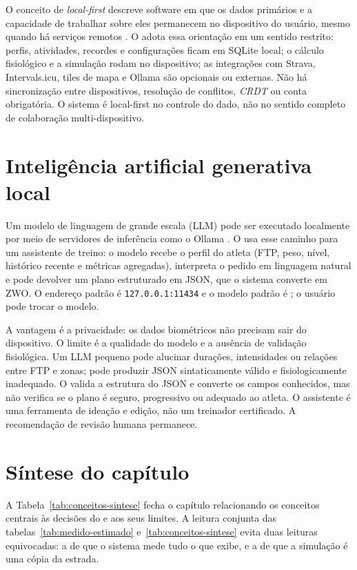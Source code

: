 O conceito de \textit{local-first} descreve software em que os dados primários
e a capacidade de trabalhar sobre eles permanecem no dispositivo do usuário,
mesmo quando há serviços remotos \cite{kleppmann2019}. O \argus{} adota essa
orientação em um sentido restrito: perfis, atividades, recordes e configurações
ficam em SQLite local; o cálculo fisiológico e a simulação rodam no
dispositivo; as integrações com Strava, Intervals.icu, tiles de mapa e Ollama
são opcionais ou externas. Não há sincronização entre dispositivos, resolução
de conflitos, \textit{CRDT} ou conta obrigatória. O sistema é local-first no
controle do dado, não no sentido completo de colaboração multi-dispositivo.

\section{Inteligência artificial generativa local}
\label{sec:ia-local}

Um modelo de linguagem de grande escala (LLM) pode ser executado localmente por
meio de servidores de inferência como o Ollama \cite{ollama2024}. O \argus{}
usa esse caminho para um assistente de treino: o modelo recebe o perfil do
atleta (FTP, peso, nível, histórico recente e métricas agregadas), interpreta
o pedido em linguagem natural e pode devolver um plano estruturado em JSON, que
o sistema converte em ZWO. O endereço padrão é \texttt{127.0.0.1:11434} e o
modelo padrão é ; o usuário pode trocar o modelo.

A vantagem é a privacidade: os dados biométricos não precisam sair do
dispositivo. O limite é a qualidade do modelo e a ausência de validação
fisiológica. Um LLM pequeno pode alucinar durações, intensidades ou relações
entre FTP e zonas; pode produzir JSON sintaticamente válido e fisiologicamente
inadequado. O \argus{} valida a estrutura do JSON e converte os campos
conhecidos, mas não verifica se o plano é seguro, progressivo ou adequado ao
atleta. O assistente é uma ferramenta de ideação e edição, não um treinador
certificado. A recomendação de revisão humana permanece.

\section{Síntese do capítulo}
\label{sec:sintese-fundamentacao}

A Tabela~\ref{tab:conceitos-sintese} fecha o capítulo relacionando os conceitos
centrais às decisões do \argus{} e aos seus limites. A leitura conjunta das
tabelas~\ref{tab:medido-estimado} e~\ref{tab:conceitos-sintese} evita duas
leituras equivocadas: a de que o sistema mede tudo o que exibe, e a de que a
simulação é uma cópia da estrada.

